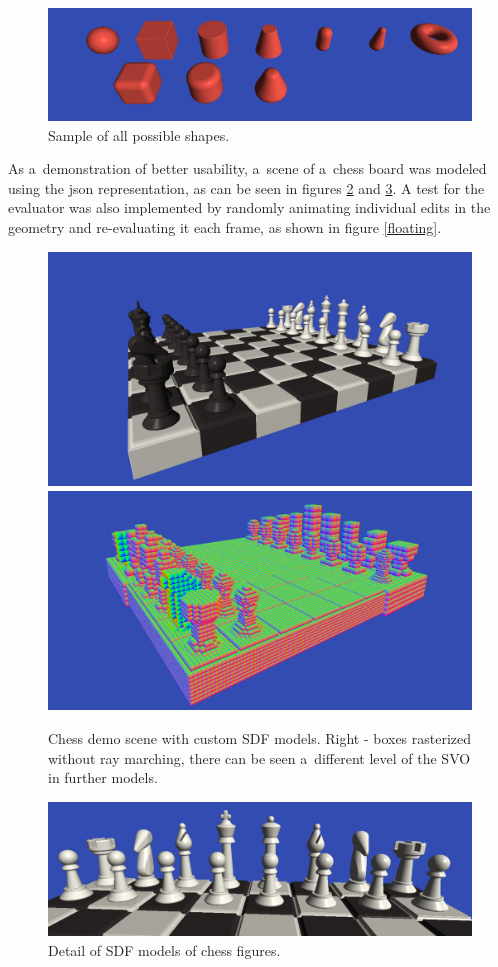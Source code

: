 \documentclass[11pt, a4paper]{article}
\begin{document}
\begin{figure}
    \centering
    \includegraphics[width=\textwidth]{primitives_scene.png}
    \caption{Sample of all possible shapes.}
    \label{primitives_scene}
\end{figure}
As a~demonstration of better usability, a~scene of a~chess board was modeled using the json representation, as can be seen in figures \ref{chess} and \ref{chess2}.
A test for the evaluator was also implemented by randomly animating individual edits in the geometry and re-evaluating it each frame, as shown in figure \ref{floating}.
\begin{figure}
    \centering
    \includegraphics[width=.45\textwidth]{chess.png}
    \includegraphics[width=.45\textwidth]{chessBoxes.png}
    \caption{Chess demo scene with custom SDF models. Right - boxes rasterized without ray marching, there can be seen a~different level of the SVO in further models.}
    \label{chess}
\end{figure}
\begin{figure}
    \centering
    \includegraphics[width=\textwidth]{chess2.png}
    \caption{Detail of SDF models of chess figures.}
    \label{chess2}
\end{figure}
\end{document}
